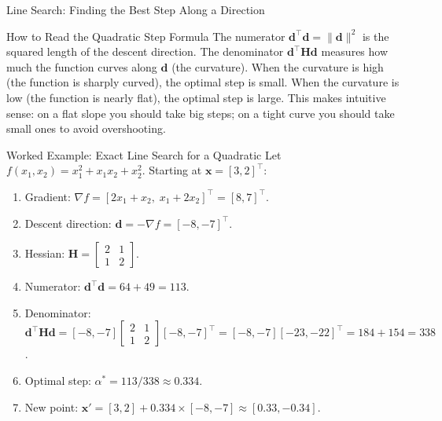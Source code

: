 \documentclass[aspectratio=169,10pt]{beamer}
\newcommand{\bx}{\mathbf{x}}
\newcommand{\bd}{\mathbf{d}}
\newcommand{\bH}{\mathbf{H}}
\newcommand{\grad}{\nabla}
\begin{document}
\begin{frame}[allowframebreaks]{Line Search: Finding the Best Step Along a Direction}
  \framebreak

  \begin{alertblock}{How to Read the Quadratic Step Formula}
    The numerator $\bd^{\top}\bd = \|\bd\|^2$ is the squared length of
    the descent direction.  The denominator $\bd^{\top}\bH\bd$ measures
    how much the function curves along $\bd$ (the curvature).  When the
    curvature is high (the function is sharply curved), the optimal step
    is small.  When the curvature is low (the function is nearly flat),
    the optimal step is large.  This makes intuitive sense: on a flat
    slope you should take big steps; on a tight curve you should take
    small ones to avoid overshooting.
  \end{alertblock}

  \begin{exampleblock}{Worked Example: Exact Line Search for a Quadratic}
    Let $f(x_1, x_2) = x_1^2 + x_1 x_2 + x_2^2$.  Starting at
    $\bx = [3, 2]^{\top}$:
    \begin{enumerate}
      \item Gradient: $\grad f = [2x_1 + x_2,\; x_1 + 2x_2]^{\top}
            = [8, 7]^{\top}$.
      \item Descent direction: $\bd = -\grad f = [-8, -7]^{\top}$.
      \item Hessian: $\bH = \begin{bmatrix} 2 & 1 \\ 1 & 2\end{bmatrix}$.
      \item Numerator: $\bd^{\top}\bd = 64 + 49 = 113$.
      \item Denominator: $\bd^{\top}\bH\bd
            = [-8,-7]\begin{bmatrix}2&1\\1&2\end{bmatrix}[-8,-7]^{\top}
            = [-8,-7][-23,-22]^{\top} = 184 + 154 = 338$.
      \item Optimal step: $\alpha^* = 113/338 \approx 0.334$.
      \item New point: $\bx' = [3,2] + 0.334\times[-8,-7]
            \approx [0.33, -0.34]$.
    \end{enumerate}
  \end{exampleblock}

\end{frame}
\end{document}
